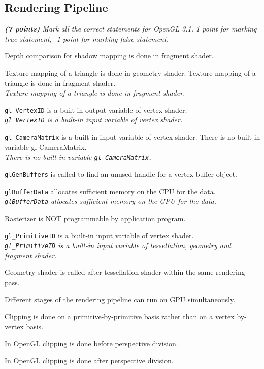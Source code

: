 \documentclass[a4paper,10pt]{article}
\newcommand{\cmark}{\ding{51}}%
\newcommand{\done}{\rlap{$\square$}{\raisebox{2pt}{\large\hspace{1pt}\cmark}}%
	\hspace{-2.5pt}}
\begin{document}
\subsection{Rendering Pipeline}
\textit{\textbf{(7 points)} Mark all the correct statements for OpenGL 3.1. 1 point for marking true statement, -1 point for marking false statement.}
\begin{todolist}
	\item[\done] Depth comparison for shadow mapping is done in fragment shader.
	\item Texture mapping of a triangle is done in geometry shader. Texture mapping of a triangle is done in fragment shader.\\
	\textit{Texture mapping of a triangle is done in fragment shader.}
	\item \texttt{gl\_VertexID} is a built-in output variable of vertex shader.\\
	\textit{\texttt{gl\_VertexID} is a built-in input variable of vertex shader.}	
	\item \texttt{gl\_CameraMatrix} is a built-in input variable of vertex shader. There is no built-in variable gl CameraMatrix.\\
	\textit{There is no built-in variable \texttt{gl\_CameraMatrix.}}
	\item[\done] \texttt{glGenBuffers} is called to find an unused handle for a vertex buffer object.
	\item \texttt{glBufferData} allocates sufficient memory on the CPU for the data. \\
	\textit{\texttt{glBufferData} allocates sufficient memory on the GPU for the data.}
	\item[\done] Rasterizer is NOT programmable by application program.
	\item \texttt{gl\_PrimitiveID} is a built-in input variable of vertex shader. \\
	\textit{\texttt{gl\_PrimitiveID} is a built-in 	input variable of tessellation, geometry and fragment shader.}
	\item[\done] Geometry shader is called after tessellation shader within the same rendering pass. 
	\item[\done] Different stages of the rendering pipeline can run on GPU simultaneously.
	\item[\done] Clipping is done on a primitive-by-primitive basis rather than on a vertex by-vertex basis.
	\item[\done] In OpenGL clipping is done before perspective division.
	\item In OpenGL clipping is done after perspective division.
\end{todolist}
\end{document}

